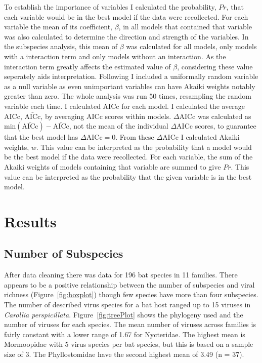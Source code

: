 To establish the importance of variables I calculated the probability, $Pr$, that each variable would be in the best model if the data were recollected.
For each variable the mean of its coefficient, $\beta$, in all models that contained that variable was also calculated to determine the direction and strength of the variables.
In the subspecies analysis, this mean of $\beta$ was calculated for all models, only models with a interaction term and only models without an interaction.
As the interaction term greatly affects the estimated value of $\beta$, considering these value seperately aids interpretation.
Following \cite{whittingham2005habitat} I included a uniformally random variable as a null variable as even unimportant variables can have Akaiki weights notably greater than zero.
The whole analysis was run 50 times, resampling the random variable each time.
I calculated AICc for each model.
I calculated the average AICc, $\bar{\text{AICc}}$, by averaging AICc scores within models.
$\Delta\text{AICc}$ was calculated as $\text{min}(\bar{\text{AICc}}) - \bar{\text{AICc}}$, not the mean of the individual $\Delta\text{AICc}$ scores, to guarantee that the best model has $\Delta\text{AICc} = 0$.
From these $\Delta\text{AICc}$ I calculated Akaiki weights, $w$.
This value can be interpreted as the probability that a model would be the best model if the data were recollected.
For each variable, the sum of the Akaiki weights of models containing that variable are summed to give $Pr$.
This value can be interpreted as the probability that the given variable is in the best model.




\section{Results}


\subsection{Number of Subspecies}

After data cleaning there was data for 196 bat species in 11 families.
There appears to be a positive relationship between the number of subspecies and viral richness (Figure~\ref{fig:boxplot}) though few species have more than four subspecies. 
The number of described virus species for a bat host ranged up to 15 viruses in \emph{Carollia perspicillata}.
Figure~\ref{fig:treePlot} shows the phylogeny used and the number of viruses for each species.
The mean number of viruses across families is fairly constant with a lower range of 1.67 for Nycteridae.
The highest mean is Mormoopidae with 5 virus species per bat species, but this is based on a sample size of 3.
The Phyllostomidae have the second highest mean  of 3.49 (n = 37).

